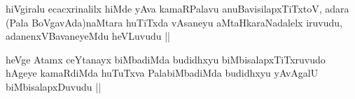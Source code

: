 
\begin{artha}
hiVgiralu ecacxrinalilx hiMde yAva kamaRPalavu anuBavisilapxTiTxtoV, adara (Pala BoVgavAda)naMtara huTiTxda vAsaneyu aMtaHkaraNadalelx iruvudu, adanenxVBavaneyeMdu heVLuvudu ||
\end{artha}


\begin{artha}
heVge Atamx ceYtanayx biMbadiMda budidhxyu biMbisalapxTiTxruvudo hAgeye kamaRdiMda huTuTxva PalabiMbadiMda budidhxyu yAvAgalU biMbisalapxDuvudu ||
\end{artha}







